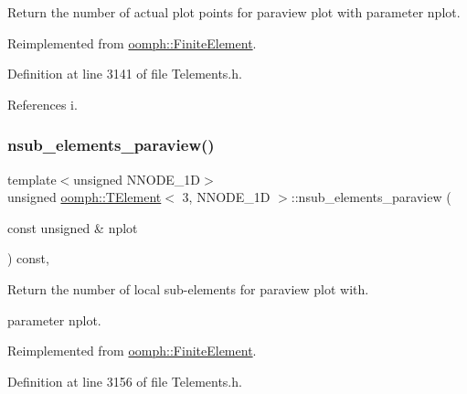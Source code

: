Return the number of actual plot points for paraview plot with parameter nplot. 



Reimplemented from \hyperlink{classoomph_1_1FiniteElement_a06d32c85753a1e302c3b345ea27f6c85}{oomph\+::\+Finite\+Element}.



Definition at line 3141 of file Telements.\+h.



References i.

\mbox{\label{classoomph_1_1TElement_3_013_00_01NNODE__1D_01_4_a483175e6ebba087c5c82eebaa0c34218}} 
\subsubsection{\texorpdfstring{nsub\+\_\+elements\+\_\+paraview()}{nsub\_elements\_paraview()}}
{\footnotesize\ttfamily template$<$unsigned N\+N\+O\+D\+E\+\_\+1D$>$ \\
unsigned \hyperlink{classoomph_1_1TElement}{oomph\+::\+T\+Element}$<$ 3, N\+N\+O\+D\+E\+\_\+1D $>$\+::nsub\+\_\+elements\+\_\+paraview (\begin{DoxyParamCaption}\item[{const unsigned \&}]{nplot }\end{DoxyParamCaption}) const\hspace{0.3cm}{\ttfamily [inline]}, {\ttfamily [virtual]}}



Return the number of local sub-\/elements for paraview plot with. 

parameter nplot. 

Reimplemented from \hyperlink{classoomph_1_1FiniteElement_aa1e11deffc8ee67adaa59ce3ade0579f}{oomph\+::\+Finite\+Element}.



Definition at line 3156 of file Telements.\+h.

\mbox{\label{classoomph_1_1TElement_3_013_00_01NNODE__1D_01_4_a9b9749d839ef049c508be889fec96a83}} 
